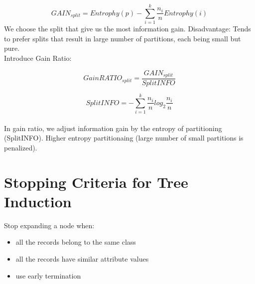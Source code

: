 \begin{multicols*}{2}
$$GAIN_{split}=Entrophy(p)-\sum_{i=1}^{k} \frac{n_i}{n}Entrophy(i)$$
\noindent We choose the split that give us the most information gain. Disadvantage: Tends to prefer splits that result in large number of partitions, each being small but pure. \\

\noindent Introduce Gain Ratio: 

$$GainRATIO_{split}=\frac{GAIN_{split}}{SplitINFO}$$

$$SplitINFO=-\sum_{i=1}^{k} \frac{n_i}{n}log_2 \frac{n_i}{n}$$ \\

\noindent In gain ratio, we adjust information gain by the entropy of partitioning (SplitINFO). Higher entropy partitionaing (large number of small partitions is penalized). 

\section{Stopping Criteria for Tree Induction}

Stop expanding a node when:
\begin{itemize}
    \item all the records belong to the same class
    \item all the records have similar attribute values
    \item use early termination
\end{itemize}

\end{multicols*}
